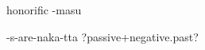 \documentclass[11pt,letterpaper]{article}
\begin{document}









honorific -masu

-s-are-naka-tta ?passive+negative.past?






\end{document}
